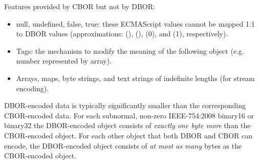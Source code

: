 \begin{BeginParPenalty}
    Features provided by CBOR but not by DBOR:
    \begin{itemize}
        \item
        null, undefined, false, true:
        these ECMAScript values cannot be mapped 1:1 to DBOR values
        (approximations: \DborNoneValue(), \DborNoneValue(), \DborIntegerValue(0), and \DborIntegerValue(1),
        respectively).

        \item Tags:
        the mechanism to modify the meaning of the following object
        (e.g. number represented by array).

        \item
        Arrays, maps, byte strings, and text strings of indefinite lengths (for stream encoding).
    \end{itemize}
\end{BeginParPenalty}

DBOR-encoded data is typically significantly smaller than the corresponding CBOR-encoded data.
For each subnormal, non-zero IEEE-754:2008 binary16 or binary32 the DBOR-encoded object consists of
\emph{exactly one byte more} than the CBOR-encoded object.
For each other object that both DBOR and CBOR can encode, the DBOR-encoded object consists of \emph{at most as many}
bytes as the CBOR-encoded object.

